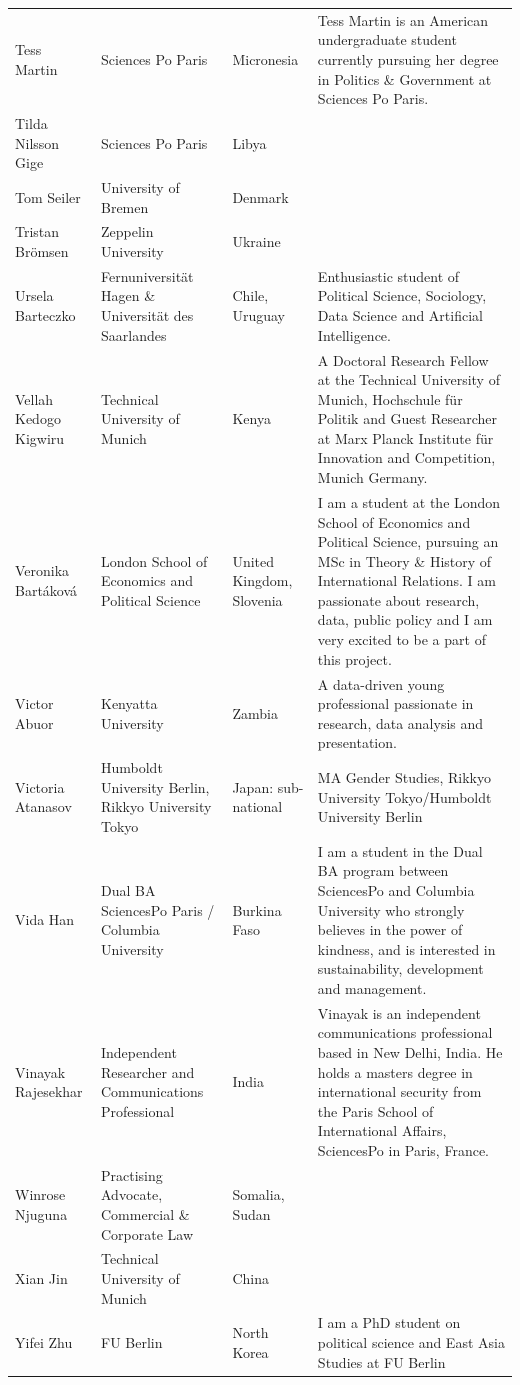 \documentclass[]{article}
\begin{document}
\begin{longtable}{l>{\raggedright\arraybackslash}p{2cm}>{\raggedright\arraybackslash}p{2cm}>{\raggedright\arraybackslash}p{3cm}}
\addlinespace
Tess Martin & Sciences Po Paris & Micronesia & Tess Martin is an American undergraduate student currently pursuing her degree in Politics \& Government at Sciences Po Paris.\\
\rowcolor{gray!6}  Tilda Nilsson Gige & Sciences Po Paris & Libya & \\
Tom Seiler & University of Bremen & Denmark & \\
\rowcolor{gray!6}  Tristan Brömsen & Zeppelin University & Ukraine & \\
Ursela Barteczko & Fernuniversität Hagen \& Universität des Saarlandes & Chile, Uruguay & Enthusiastic student of Political Science, Sociology, Data Science and Artificial Intelligence.\\
\addlinespace
\rowcolor{gray!6}  Vellah Kedogo Kigwiru & Technical University of Munich & Kenya & A Doctoral Research Fellow at the Technical University of Munich, Hochschule für Politik and Guest Researcher at Marx Planck Institute für Innovation and Competition, Munich Germany.\\
Veronika Bartáková & London School of Economics and Political Science & United Kingdom, Slovenia & I am a student at the London School of Economics and Political Science, pursuing an MSc in Theory \& History of International Relations. I am passionate about research, data, public policy and I am very excited to be a part of this project.\\
\rowcolor{gray!6}  Victor Abuor & Kenyatta University & Zambia & A data-driven young professional passionate in research, data analysis and presentation.\\
Victoria Atanasov & Humboldt University Berlin, Rikkyo University Tokyo & Japan: sub-national & MA Gender Studies, Rikkyo University Tokyo/Humboldt University Berlin\\
\rowcolor{gray!6}  Vida Han & Dual BA SciencesPo Paris / Columbia University & Burkina Faso & I am a student in the Dual BA program between SciencesPo and Columbia University who strongly believes in the power of kindness, and is interested in sustainability, development and management.\\
\addlinespace
Vinayak Rajesekhar & Independent Researcher and Communications Professional & India & Vinayak is an independent communications professional based in New Delhi, India. He holds a masters degree in international security from the Paris School of International Affairs, SciencesPo in Paris, France.\\
\rowcolor{gray!6}  Winrose Njuguna & Practising Advocate, Commercial \& Corporate Law & Somalia, Sudan & \\
Xian Jin & Technical University of Munich & China & \\
\rowcolor{gray!6}  Yifei Zhu & FU Berlin & North Korea & I am a PhD student on political science and East Asia Studies at FU Berlin\\
\bottomrule
\end{longtable}
\end{document}
